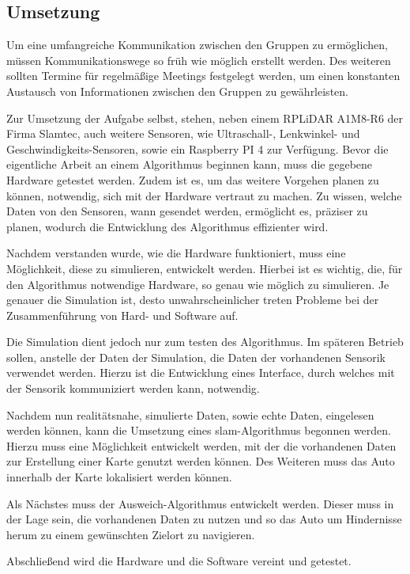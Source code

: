 \subsection{Umsetzung}
Um eine umfangreiche Kommunikation zwischen den Gruppen zu ermöglichen, müssen Kommunikationswege so früh wie möglich erstellt werden.
Des weiteren sollten Termine für regelmäßige Meetings festgelegt werden, um einen konstanten Austausch von Informationen zwischen den Gruppen zu gewährleisten.

Zur Umsetzung der Aufgabe selbst, stehen, neben einem RPLiDAR A1M8-R6 der Firma Slamtec, auch weitere Sensoren, 
wie Ultraschall-, Lenkwinkel- und Geschwindigkeits-Sensoren, sowie ein Raspberry PI 4 zur Verfügung.
Bevor die eigentliche Arbeit an einem Algorithmus beginnen kann, muss die gegebene Hardware getestet werden. 
Zudem ist es, um das weitere Vorgehen planen zu können, notwendig, sich mit der Hardware vertraut zu machen. 
Zu wissen, welche Daten von den Sensoren, wann gesendet werden, ermöglicht es, präziser zu planen, wodurch die Entwicklung des Algorithmus effizienter wird.

Nachdem verstanden wurde, wie die Hardware funktioniert, muss eine Möglichkeit, diese zu simulieren, entwickelt werden.
Hierbei ist es wichtig, die, für den Algorithmus notwendige Hardware, so genau wie möglich zu simulieren. 
Je genauer die Simulation ist, desto unwahrscheinlicher treten Probleme bei der Zusammenführung von Hard- und Software auf.

Die Simulation dient jedoch nur zum testen des Algorithmus.
Im späteren Betrieb sollen, anstelle der Daten der Simulation, die Daten der vorhandenen Sensorik verwendet werden.
Hierzu ist die Entwicklung eines Interface, durch welches mit der Sensorik kommuniziert werden kann, notwendig.

Nachdem nun realitätsnahe, simulierte Daten, sowie echte Daten, eingelesen werden können, kann die Umsetzung eines \acf{slam}-Algorithmus begonnen werden.
Hierzu muss eine Möglichkeit entwickelt werden, mit der die vorhandenen Daten zur Erstellung einer Karte genutzt werden können.
Des Weiteren muss das Auto innerhalb der Karte lokalisiert werden können.

Als Nächstes muss der Ausweich-Algorithmus entwickelt werden.
Dieser muss in der Lage sein, die vorhandenen Daten zu nutzen und so das Auto um Hindernisse herum zu einem gewünschten Zielort zu navigieren.

Abschließend wird die Hardware und die Software vereint und getestet.

\newpage
